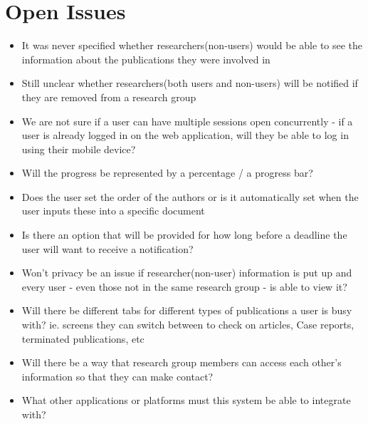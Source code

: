 \documentclass[a4paper,12pt]{report}
\begin{document}
\section{Open Issues}
\begin{itemize}
	\item It was never specified whether researchers(non-users) would be able to see the information about the publications they were involved in
	\item Still unclear whether researchers(both users and non-users) will be notified if they are removed from a research group
	\item We are not sure if a user can have multiple sessions open concurrently - if a user is already logged in on the web application, will they be able to log in using their mobile device?
	\item Will the progress be represented by a percentage / a progress bar?
	\item Does the user set the order of the authors or is it automatically set when the user inputs these into a specific document

	\item Is there an option that will be provided for how long before a deadline the user will want to receive a notification?
	\item Won't privacy be an issue if researcher(non-user) information is put up and every user - even those not in the same research group - is able to view it?
	\item Will there be different tabs for different types of publications a user is busy with? ie. screens they can switch between to check on articles, Case reports, terminated publications, etc
	\item Will there be a way that research group members can access each other's information so that they can make contact?
	\item What other applications or platforms must this system be able to integrate with?
\end{itemize}
\end{document}

